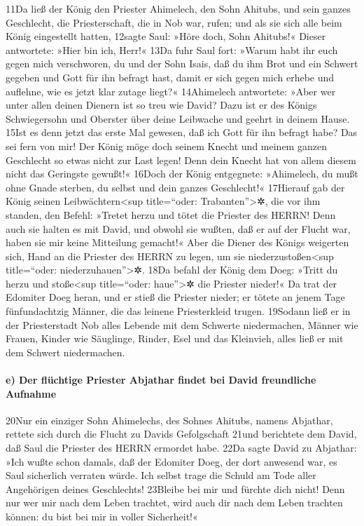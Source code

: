 11Da ließ der König den Priester Ahimelech, den Sohn Ahitubs, und sein
ganzes Geschlecht, die Priesterschaft, die in Nob war, rufen; und als
sie sich alle beim König eingestellt hatten, 12sagte Saul: »Höre doch,
Sohn Ahitubs!« Dieser antwortete: »Hier bin ich, Herr!« 13Da fuhr Saul
fort: »Warum habt ihr euch gegen mich verschworen, du und der Sohn
Isais, daß du ihm Brot und ein Schwert gegeben und Gott für ihn befragt
hast, damit er sich gegen mich erhebe und auflehne, wie es jetzt klar
zutage liegt?« 14Ahimelech antwortete: »Aber wer unter allen deinen
Dienern ist so treu wie David? Dazu ist er des Königs Schwiegersohn und
Oberster über deine Leibwache und geehrt in deinem Hause. 15Ist es denn
jetzt das erste Mal gewesen, daß ich Gott für ihn befragt habe? Das sei
fern von mir! Der König möge doch seinem Knecht und meinem ganzen
Geschlecht so etwas nicht zur Last legen! Denn dein Knecht hat von allem
diesem nicht das Geringste gewußt!« 16Doch der König entgegnete:
»Ahimelech, du mußt ohne Gnade sterben, du selbst und dein ganzes
Geschlecht!« 17Hierauf gab der König seinen Leibwächtern\textless sup
title=``oder: Trabanten''\textgreater✲, die vor ihm standen, den Befehl:
»Tretet herzu und tötet die Priester des HERRN! Denn auch sie halten es
mit David, und obwohl sie wußten, daß er auf der Flucht war, haben sie
mir keine Mitteilung gemacht!« Aber die Diener des Königs weigerten
sich, Hand an die Priester des HERRN zu legen, um sie
niederzustoßen\textless sup title=``oder: niederzuhauen''\textgreater✲.
18Da befahl der König dem Doeg: »Tritt du herzu und stoße\textless sup
title=``oder: haue''\textgreater✲ die Priester nieder!« Da trat der
Edomiter Doeg heran, und er stieß die Priester nieder; er tötete an
jenem Tage fünfundachtzig Männer, die das leinene Priesterkleid trugen.
19Sodann ließ er in der Priesterstadt Nob alles Lebende mit dem Schwerte
niedermachen, Männer wie Frauen, Kinder wie Säuglinge, Rinder, Esel und
das Kleinvieh, alles ließ er mit dem Schwert niedermachen.

\hypertarget{e-der-fluxfcchtige-priester-abjathar-findet-bei-david-freundliche-aufnahme}{%
\paragraph{e) Der flüchtige Priester Abjathar findet bei David
freundliche
Aufnahme}\label{e-der-fluxfcchtige-priester-abjathar-findet-bei-david-freundliche-aufnahme}}

20Nur ein einziger Sohn Ahimelechs, des Sohnes Ahitubs, namens Abjathar,
rettete sich durch die Flucht zu Davids Gefolgschaft 21und berichtete
dem David, daß Saul die Priester des HERRN ermordet habe. 22Da sagte
David zu Abjathar: »Ich wußte schon damals, daß der Edomiter Doeg, der
dort anwesend war, es Saul sicherlich verraten würde. Ich selbst trage
die Schuld am Tode aller Angehörigen deines Geschlechts! 23Bleibe bei
mir und fürchte dich nicht! Denn nur wer mir nach dem Leben trachtet,
wird auch dir nach dem Leben trachten können: du bist bei mir in voller
Sicherheit!«

